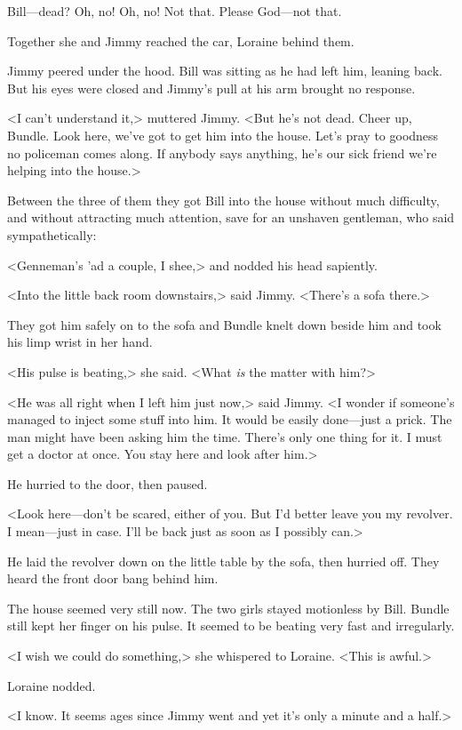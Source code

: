 Bill—dead? Oh, no! Oh, no! Not that. Please God—not that.

Together she and Jimmy reached the car, Loraine behind them.

Jimmy peered under the hood. Bill was sitting as he had left him, leaning back. But his eyes were closed and Jimmy's pull at his arm brought no response.

<I can't understand it,> muttered Jimmy. <But he's not dead. Cheer up, Bundle. Look here, we've got to get him into the house. Let's pray to goodness no policeman comes along. If anybody says anything, he's our sick friend we're helping into the house.>

Between the three of them they got Bill into the house without much difficulty, and without attracting much attention, save for an unshaven gentleman, who said sympathetically:

<Genneman's 'ad a couple, I shee,> and nodded his head sapiently.

<Into the little back room downstairs,> said Jimmy. <There's a sofa there.>

They got him safely on to the sofa and Bundle knelt down beside him and took his limp wrist in her hand.

<His pulse is beating,> she said. <What \emph{is} the matter with him?>

<He was all right when I left him just now,> said Jimmy. <I wonder if someone's managed to inject some stuff into him. It would be easily done—just a prick. The man might have been asking him the time. There's only one thing for it. I must get a doctor at once. You stay here and look after him.>

He hurried to the door, then paused.

<Look here—don't be scared, either of you. But I'd better leave you my revolver. I mean—just in case. I'll be back just as soon as I possibly can.>

He laid the revolver down on the little table by the sofa, then hurried off. They heard the front door bang behind him.

The house seemed very still now. The two girls stayed motionless by Bill. Bundle still kept her finger on his pulse. It seemed to be beating very fast and irregularly.

<I wish we could do something,> she whispered to Loraine. <This is awful.>

Loraine nodded.

<I know. It seems ages since Jimmy went and yet it's only a minute and a half.>

